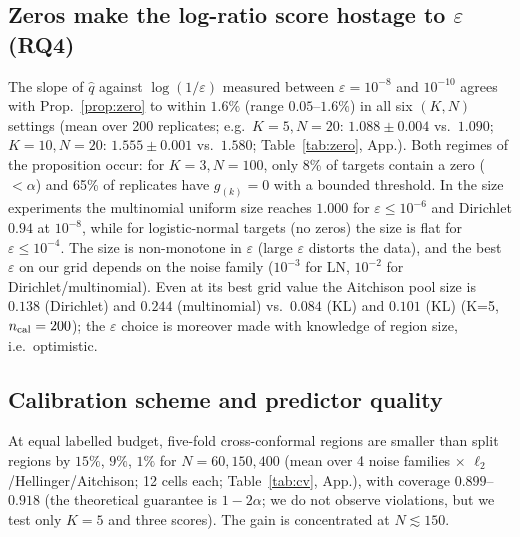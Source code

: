 \documentclass{article}
\theoremstyle{plain}
\theoremstyle{remark}
\begin{document}
\subsection{Zeros make the log-ratio score hostage to $\varepsilon$ (RQ4)}
The slope of $\hat q$ against $\log(1/\varepsilon)$ measured between $\varepsilon=10^{-8}$ and $10^{-10}$ agrees with Prop.~\ref{prop:zero} to within $1.6\%$ (range $0.05$--$1.6\%$) in all six $(K,N)$ settings (mean over 200 replicates; e.g.\ $K=5,N=20$: $1.088\pm0.004$ vs.\ $1.090$; $K=10,N=20$: $1.555\pm0.001$ vs.\ $1.580$; Table~\ref{tab:zero}, App.). Both regimes of the proposition occur: for $K{=}3,N{=}100$, only 8\% of targets contain a zero ($<\alpha$) and 65\% of replicates have $g_{(k)}=0$ with a bounded threshold. In the size experiments the multinomial uniform size reaches $1.000$ for $\varepsilon\le10^{-6}$ and Dirichlet $0.94$ at $10^{-8}$, while for logistic-normal targets (no zeros) the size is flat for $\varepsilon\le10^{-4}$. The size is non-monotone in $\varepsilon$ (large $\varepsilon$ distorts the data), and the best $\varepsilon$ on our grid depends on the noise family ($10^{-3}$ for LN, $10^{-2}$ for Dirichlet/multinomial). Even at its best grid value the Aitchison pool size is $0.138$ (Dirichlet) and $0.244$ (multinomial) vs.\ $0.084$ (KL) and $0.101$ (KL) (K=5, $n_{\rm cal}=200$); the $\varepsilon$ choice is moreover made with knowledge of region size, i.e.\ optimistic.

\subsection{Calibration scheme and predictor quality}
At equal labelled budget, five-fold cross-conformal regions are smaller than split regions by $15\%$, $9\%$, $1\%$ for $N=60,150,400$ (mean over 4 noise families $\times$ $\ell_2$/Hellinger/Aitchison; 12 cells each; Table~\ref{tab:cv}, App.), with coverage $0.899$--$0.918$ (the theoretical guarantee is $1-2\alpha$; we do not observe violations, but we test only $K=5$ and three scores). The gain is concentrated at $N\lesssim150$.
\end{document}
